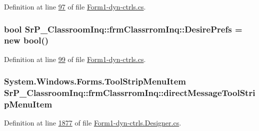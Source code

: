 \-Definition at line \hyperlink{_form1-dyn-ctrls_8cs_source_l00097}{97} of file \hyperlink{_form1-dyn-ctrls_8cs_source}{\-Form1-\/dyn-\/ctrls.\-cs}.

\hypertarget{class_sr_p___classroom_inq_1_1frm_classrrom_inq_a263bbbace2f9c25e5f92573e5f4845ba}{
\subsubsection[{\-Desire\-Prefs}]{\setlength{\rightskip}{0pt plus 5cm}bool {\bf \-Sr\-P\-\_\-\-Classroom\-Inq\-::frm\-Classrrom\-Inq\-::\-Desire\-Prefs} = new bool()}}
\label{class_sr_p___classroom_inq_1_1frm_classrrom_inq_a263bbbace2f9c25e5f92573e5f4845ba}


\-Definition at line \hyperlink{_form1-dyn-ctrls_8cs_source_l00099}{99} of file \hyperlink{_form1-dyn-ctrls_8cs_source}{\-Form1-\/dyn-\/ctrls.\-cs}.

\hypertarget{class_sr_p___classroom_inq_1_1frm_classrrom_inq_a8df7e0c2f5ac4cb1494004d85940a786}{
\subsubsection[{direct\-Message\-Tool\-Strip\-Menu\-Item}]{\setlength{\rightskip}{0pt plus 5cm}\-System.\-Windows.\-Forms.\-Tool\-Strip\-Menu\-Item {\bf \-Sr\-P\-\_\-\-Classroom\-Inq\-::frm\-Classrrom\-Inq\-::direct\-Message\-Tool\-Strip\-Menu\-Item}}}
\label{class_sr_p___classroom_inq_1_1frm_classrrom_inq_a8df7e0c2f5ac4cb1494004d85940a786}


\-Definition at line \hyperlink{_form1-dyn-ctrls_8_designer_8cs_source_l01877}{1877} of file \hyperlink{_form1-dyn-ctrls_8_designer_8cs_source}{\-Form1-\/dyn-\/ctrls.\-Designer.\-cs}.

